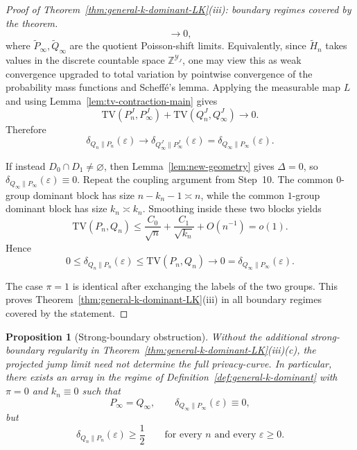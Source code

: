 \documentclass{article}
\newtheorem{proposition}[theorem]{Proposition}
\newcommand{\TV}{\mathrm{TV}}
\newcommand{\1}{\mathbf 1}
\newcommand{\privacycurve}{\mbox{privacy-curve}}
\begin{document}
\begin{proof}[Proof of Theorem~\ref{thm:general-k-dominant-LK}(iii): boundary regimes covered by the theorem]
\[\longrightarrow 0,
\]
where $\widetilde P_\infty,\widetilde Q_\infty$ are the quotient Poisson-shift limits. Equivalently, since
$\widetilde H_n$ takes values in the discrete countable space $\mathbb Z^{\mathcal Y_J}$, one may view this as weak
convergence upgraded to total variation by pointwise convergence of the probability mass functions and Scheff\'e's
lemma. Applying the measurable map $L$ and using Lemma~\ref{lem:tv-contraction-main} gives
\[
\TV(P_n^J,P_\infty^J)+\TV(Q_n^J,Q_\infty^J)\longrightarrow 0.
\]
Therefore
\[
\delta_{Q_n\|P_n}(\varepsilon)
\to
\delta_{Q_\infty^J\|P_\infty^J}(\varepsilon)
=
\delta_{Q_\infty\|P_\infty}(\varepsilon).
\]

If instead $D_0\cap D_1\neq\varnothing$, then Lemma~\ref{lem:new-geometry} gives $\Delta=0$, so
$\delta_{Q_\infty\|P_\infty}(\varepsilon)\equiv 0$. Repeat the coupling argument from Step~10. The common
$0$-group dominant block has size $n-k_n-1\asymp n$, while the common $1$-group dominant block has size
$k_n\asymp k_n$. Smoothing inside these two blocks yields
\[
\TV(P_n,Q_n)\le \frac{C_0}{\sqrt n}+\frac{C_1}{\sqrt{k_n}}+O(n^{-1})=o(1).
\]
Hence
\[
0\le \delta_{Q_n\|P_n}(\varepsilon)\le \TV(P_n,Q_n)\to 0=\delta_{Q_\infty\|P_\infty}(\varepsilon).
\]

The case $\pi=1$ is identical after exchanging the labels of the two groups. This proves
Theorem~\ref{thm:general-k-dominant-LK}(iii) in all boundary regimes covered by the statement.
\end{proof}

\begin{proposition}[Strong-boundary obstruction]
\label{prop:strong-boundary-obstruction}
Without the additional strong-boundary regularity in Theorem~\ref{thm:general-k-dominant-LK}\textup{(iii)(c)},
the projected jump limit need not determine the full \privacycurve.
In particular, there exists an array in the regime of Definition~\ref{def:general-k-dominant} with $\pi=0$ and
$k_n\equiv 0$ such that
\[
P_\infty=Q_\infty,
\qquad
\delta_{Q_\infty\|P_\infty}(\varepsilon)\equiv 0,
\]
but
\[
\delta_{Q_n\|P_n}(\varepsilon)\ge \frac12
\qquad\text{for every }n\text{ and every }\varepsilon\ge 0.
\]
\end{proposition}
\end{document}
